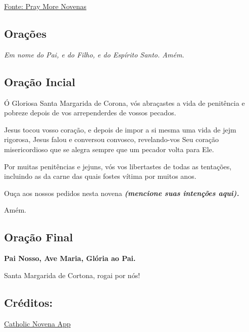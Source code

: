 \documentclass[18pt]{article}
\begin{document}
\vfill

\begin{center}
 \href{https://www.praymorenovenas.com/st-margaret-of-cortona-novena}{Fonte: Pray More Novenas}
\end{center}


\newpage
\begin{center}
 \section{Orações}\label{sec:Orações} %
\textit{Em nome do Pai, e do Filho, e do Espírito Santo. Amém.}
\end{center}

\subsection{Oração Incial}\label{sec:Oração_Inicial} %

Ó Gloriosa Santa Margarida de Corona, vós abraçastes a vida de penitência e pobreze depois de vos arrependerdes de vossos pecados.

Jesus tocou vosso coração, e depois de impor a si mesma uma vida de jejm rigorosa, Jesus falou e conversou convosco, revelando-vos Seu coração misericordioso que se alegra sempre que um pecador volta para Ele.

Por muitas penitências e jejuns, vós vos libertastes de todas as tentações, incluindo as da carne das quais fostes vítima por muitos anos.

Ouça aos nossos pedidos nesta novena \textbf{\textit{(mencione suas intenções aqui).}}

Amém.

\subsection{Oração Final}\label{sec:Oração_Final} %

\begin{center}
\textbf{Pai Nosso, Ave Maria, Glória ao Pai.}

Santa Margarida de Cortona, rogai por nós!
\end{center}

\subsection*{Créditos:}
\href{https://catholicnovenaapp.com/novenas/st-margaret-of-cortona-novena/#day-1-prayer}{Catholic Novena App}
\end{document}
